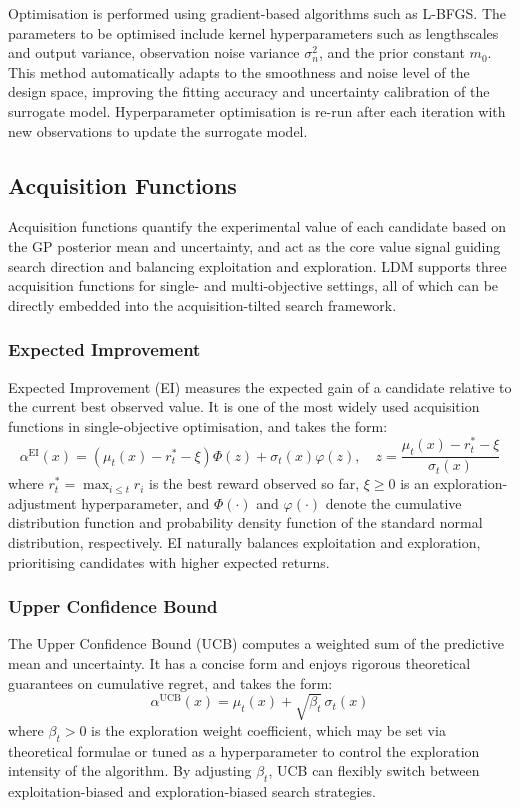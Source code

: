 Optimisation is performed using gradient-based algorithms such as L-BFGS. The parameters to be optimised include kernel hyperparameters such as lengthscales and output variance, observation noise variance $\sigma_n^2$, and the prior constant $m_0$. This method automatically adapts to the smoothness and noise level of the design space, improving the fitting accuracy and uncertainty calibration of the surrogate model. Hyperparameter optimisation is re-run after each iteration with new observations to update the surrogate model.

\subsection{Acquisition Functions}
Acquisition functions quantify the experimental value of each candidate based on the GP posterior mean and uncertainty, and act as the core value signal guiding search direction and balancing exploitation and exploration. LDM supports three acquisition functions for single- and multi-objective settings, all of which can be directly embedded into the acquisition-tilted search framework.

\subsubsection{Expected Improvement}
Expected Improvement (EI) \citep{jonesEfficientGlobalOptimization1998} measures the expected gain of a candidate relative to the current best observed value. It is one of the most widely used acquisition functions in single-objective optimisation, and takes the form:
\begin{equation}
\alpha^{\text{EI}}(x) = \left(\mu_t(x) - r_t^* - \xi\right) \Phi(z) + \sigma_t(x) \varphi(z), \quad z = \frac{\mu_t(x) - r_t^* - \xi}{\sigma_t(x)}
\label{eq:ei}
\end{equation}
where $r_t^* = \max_{i \le t} r_i$ is the best reward observed so far, $\xi \ge 0$ is an exploration-adjustment hyperparameter, and $\Phi(\cdot)$ and $\varphi(\cdot)$ denote the cumulative distribution function and probability density function of the standard normal distribution, respectively. EI naturally balances exploitation and exploration, prioritising candidates with higher expected returns.

\subsubsection{Upper Confidence Bound}
The Upper Confidence Bound (UCB) \citep{srinivas2010gaussian} computes a weighted sum of the predictive mean and uncertainty. It has a concise form and enjoys rigorous theoretical guarantees on cumulative regret, and takes the form:
\begin{equation}
\alpha^{\text{UCB}}(x) = \mu_t(x) + \sqrt{\beta_t}\, \sigma_t(x)
\label{eq:ucb}
\end{equation}
where $\beta_t > 0$ is the exploration weight coefficient, which may be set via theoretical formulae or tuned as a hyperparameter to control the exploration intensity of the algorithm. By adjusting $\beta_t$, UCB can flexibly switch between exploitation-biased and exploration-biased search strategies.

